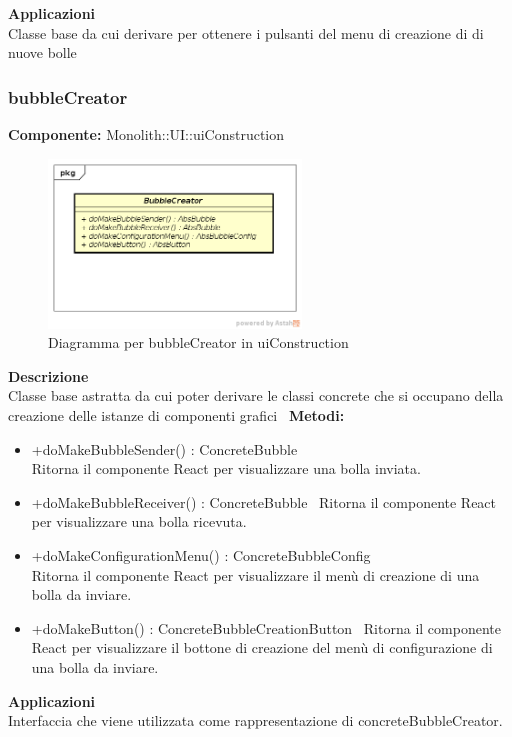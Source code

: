 \textbf{Applicazioni}\\
Classe base da cui derivare per ottenere i pulsanti del menu di creazione di di nuove bolle 


\clearpage

\subsubsection{bubbleCreator}
\textbf{Componente:}  Monolith::UI::uiConstruction\\
   \FloatBarrier
   \begin{figure}[ht]
   \centering
   \includegraphics[width=0.6\textwidth]{img/single-bubbleCreator}
   \caption{{Diagramma per bubbleCreator in uiConstruction}}
\end{figure}
\FloatBarrier
\textbf{Descrizione}\\
Classe base astratta da cui poter derivare le classi concrete che si occupano della creazione delle istanze  di componenti grafici  \ 
\textbf{Metodi:}
\begin{itemize}
\item +doMakeBubbleSender() : ConcreteBubble 
\\
Ritorna il componente React per visualizzare una bolla inviata.
\item +doMakeBubbleReceiver() : ConcreteBubble 
\ 
Ritorna il componente React per visualizzare una bolla ricevuta.
\item +doMakeConfigurationMenu() : ConcreteBubbleConfig 
\\
Ritorna il componente React per visualizzare il menù di creazione di una bolla da inviare.
\item +doMakeButton() : ConcreteBubbleCreationButton 
\ 
Ritorna il componente React per visualizzare il bottone di creazione del menù di configurazione di una bolla da inviare.

\end{itemize} 


\textbf{Applicazioni}\\
Interfaccia che viene utilizzata come rappresentazione di concreteBubbleCreator. 



